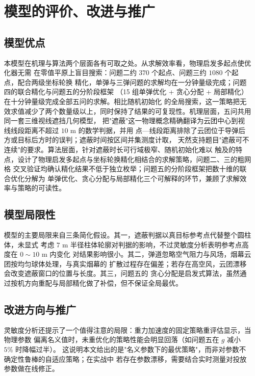 \documentclass[12pt, a4paper]{article}
\begin{document}
\section{模型的评价、改进与推广}

\subsection{模型优点}

本模型在机理与算法两个层面各有可取之处。从求解效率看，物理启发多起点使优化器无需
在零值平原上盲目搜索：问题二约 $370$ 个起点、问题三约 $1080$ 个起点，配合两级坐标轮换
精化，单弹与三弹问题的求解均在一分钟量级完成；问题四的联合精化与问题五的分阶段框架
（15 组单弹优化 + 贪心分配 + 局部精化）在十分钟量级完成全部五问的求解。相比随机初始化
的全局搜索，这一策略把无效求值减少了两个数量级以上，同时保持了结果的可复现性。机理层面，五问共用同一套三维视线遮挡几何模型，
把"遮蔽"这一物理概念精确翻译为云团中心到视线线段距离不超过 $10$ m 的数学判据，并用
点—线段距离排除了云团位于导弹后方或目标后方时的误判；遮蔽时间按区间并集测度计取，
天然支持题目"遮蔽可不连续"的要求。算法层面，针对遮蔽时长可行域极窄、随机初始化难以
触及的特点，设计了物理启发多起点与坐标轮换精化相结合的求解策略，问题二、三的粗网格
交叉验证均确认精化结果不低于独立枚举；问题五的分阶段框架把数十维的联合优化分解为
单弹优化、贪心分配与局部精化三个可解释的环节，兼顾了求解效率与策略的可读性。

\subsection{模型局限性}

模型的主要局限来自三条简化假设。其一，遮蔽判据以真目标参考点代替整个圆柱体，未显式
考虑 $7$ m 半径柱体轮廓对判据的影响，不过灵敏度分析表明参考点高度在 $0\sim10$ m 内变化
对结果影响很小。其二，弹道忽略空气阻力与风场，烟幕云团按均匀球体处理，与真实烟幕的
扩散过程存在偏差；若存在高空风，云团漂移会改变遮蔽窗口的位置与长度。其三，问题五的
贪心分配是启发式算法，虽然通过按机方向重配与局部精化做了补偿，但不保证全局最优。

\subsection{改进方向与推广}

灵敏度分析还提示了一个值得注意的局限：重力加速度的固定策略重评估显示，当物理参数
偏离名义值时，未重优化的策略性能会明显回落（如问题五在 $g$ 减小 $5\%$ 时降幅过半）。
这说明本文给出的是"名义参数下的最优策略"，而非对参数不确定性鲁棒的自适应策略；在实战中
若存在参数漂移，需要结合实时测量对投放参数做在线修正。
\end{document}
